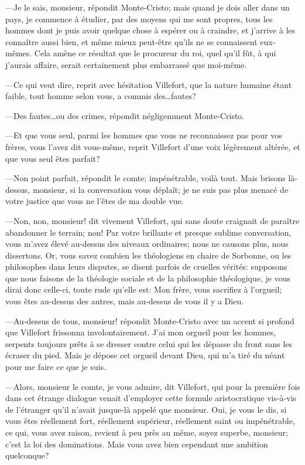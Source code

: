 —Je le sais, monsieur, répondit Monte-Cristo; mais quand je dois aller dans un pays, je commence à étudier, par des moyens qui me sont propres, tous les hommes dont je puis avoir quelque chose à espérer ou à craindre, et j'arrive à les connaître aussi bien, et même mieux peut-être qu'ils ne se connaissent eux-mêmes. Cela amène ce résultat que le procureur du roi, quel qu'il fût, à qui j'aurais affaire, serait certainement plus embarrassé que moi-même. 

—Ce qui veut dire, reprit avec hésitation Villefort, que la nature humaine étant faible, tout homme selon vous, a commis des\dots fautes? 

—Des fautes\dots ou des crimes, répondit négligemment Monte-Cristo. 

—Et que vous seul, parmi les hommes que vous ne reconnaissez pas pour vos frères, vous l'avez dit vous-même, reprit Villefort d'une voix légèrement altérée, et que vous seul êtes parfait? 

—Non point parfait, répondit le comte; impénétrable, voilà tout. Mais brisons là-dessus, monsieur, si la conversation vous déplaît; je ne suis pas plus menacé de votre justice que vous ne l'êtes de ma double vue.  

—Non, non, monsieur! dit vivement Villefort, qui sans doute craignait de paraître abandonner le terrain; non! Par votre brillante et presque sublime conversation, vous m'avez élevé au-dessus des niveaux ordinaires; nous ne causons plus, nous dissertons. Or, vous savez combien les théologiens en chaire de Sorbonne, ou les philosophes dans leurs disputes, se disent parfois de cruelles vérités: supposons que nous faisons de la théologie sociale et de la philosophie théologique, je vous dirai donc celle-ci, toute rude qu'elle est: Mon frère, vous sacrifiez à l'orgueil; vous êtes au-dessus des autres, mais au-dessus de vous il y a Dieu. 

—Au-dessus de tous, monsieur! répondit Monte-Cristo avec un accent si profond que Villefort frissonna involontairement. J'ai mon orgueil pour les hommes, serpents toujours prêts à se dresser contre celui qui les dépasse du front sans les écraser du pied. Mais je dépose cet orgueil devant Dieu, qui m'a tiré du néant pour me faire ce que je suis. 

—Alors, monsieur le comte, je vous admire, dit Villefort, qui pour la première fois dans cet étrange dialogue venait d'employer cette formule aristocratique vis-à-vis de l'étranger qu'il n'avait jusque-là appelé que monsieur. Oui, je vous le dis, si vous êtes réellement fort, réellement supérieur, réellement saint ou impénétrable, ce qui, vous avez raison, revient à peu près au même, soyez superbe, monsieur; c'est la loi des dominations. Mais vous avez bien cependant une ambition quelconque? 

